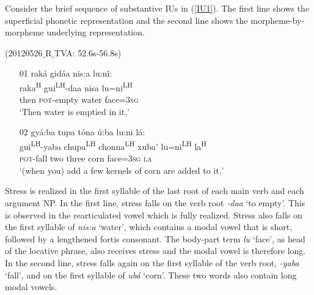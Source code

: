 Consider the brief sequence of substantive IUs in (\ref{IU1}). The first line shows the superficial phonetic representation and the second line shows the morpheme-by-morpheme underlying representation.


\ea\label{IU1} (20120526$\_$R$\_$TVA: 52.6s-56.8s)
\begin{itemize}
\item[01]
\glll rak\'{a} gid\'{a}a nis:a lu:n\v{i:} \\
raka\textsuperscript{H} gui\textsuperscript{LH}-daa nisa lu=ni\textsuperscript{LH}	\\
then \textsc{pot}-empty water face=\textsc{3sg} \\
\glt `Then water is emptied in it,'



\item[02]
\glll gy\'{a}:ba tupa t\'{o}na \'{u}:ba lu:ni l\'{a}: \\
gui\textsuperscript{LH}-yaba chupa\textsuperscript{LH} chonna\textsuperscript{LH} xuba' lu=ni\textsuperscript{LH} la\textsuperscript{H}	\\
\textsc{pot}-fall two three corn face=\textsc{3sg} \textsc{la} \\
\glt `(when you) add a few kernels of corn are added to it,'

\end{itemize}
\z

Stress is realized in the first syllable of the last root of each main verb and each argument NP. In the first line, stress falls on the verb root \textit{-daa} `to empty'. This is observed in the rearticulated vowel which is fully realized. Stress also falls on the first syllable of \textit{nis:a} `water', which contains a modal vowel that is short, followed by a lengthened fortis consonant. The body-part term \textit{lu} `face', as head of the locative phrase, also receives stress and the modal vowel is therefore long. In the second line, stress falls again on the first syllable of the verb root, \textit{-yaba} `fall', and on the first syllable of \textit{ub\'{a}} `corn'. These two words also contain long modal vowels. 


